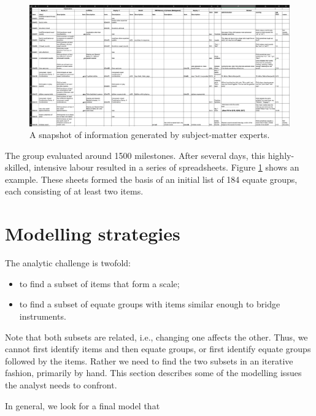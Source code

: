 \documentclass[
]{book}
\providecommand{\tightlist}{%
  \setlength{\itemsep}{0pt}\setlength{\parskip}{0pt}}
\begin{document}
\begin{figure}

{\centering \includegraphics[width=1\linewidth]{fig/equate_excel} 

}

\caption{A snapshot of information generated by subject-matter experts.}\label{fig:equatesheetpic}
\end{figure}



The group evaluated around 1500 milestones. After several days, this highly-skilled, intensive labour resulted in a series of spreadsheets. Figure \ref{fig:equatesheetpic} shows an example. These sheets formed the basis of an initial list of 184 equate groups, each consisting of at least two items.

\hypertarget{sec:modellingstrategies}{%
\section{Modelling strategies}\label{sec:modellingstrategies}}

The analytic challenge is twofold:

\begin{itemize}
\tightlist
\item
  to find a subset of items that form a scale;
\item
  to find a subset of equate groups with items similar enough to bridge instruments.
\end{itemize}

Note that both subsets are related, i.e., changing one affects the other. Thus, we cannot first identify items and then equate groups, or first identify equate groups followed by the items. Rather we need to find the two subsets in an iterative fashion, primarily by hand. This section describes some of the modelling issues the analyst needs to confront.

In general, we look for a final model that
\end{document}
